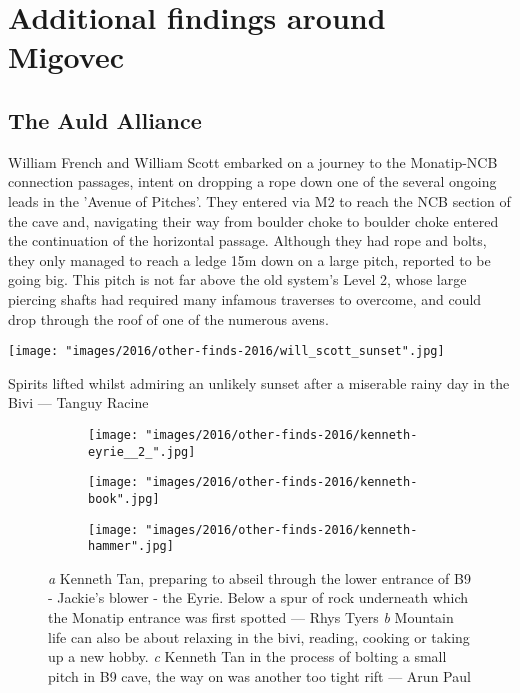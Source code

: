 \section{Additional findings around Migovec}

\subsection{The Auld Alliance}
William French and William Scott embarked on a journey to the Monatip-NCB connection passages, intent on dropping a rope down one of the several ongoing leads in the 'Avenue of Pitches'. They entered via M2 to reach the NCB section of the cave and, navigating their way from boulder choke to boulder choke entered the continuation of the horizontal passage. Although they had rope and bolts, they only managed to reach a ledge 15m down on a large pitch, reported to be going big. This pitch is not far above the old system's Level 2, whose large piercing shafts had required many infamous traverses to overcome, and could drop through the roof of one of the numerous avens.

\begin{marginfigure}
\checkoddpage \ifoddpage \forcerectofloat \else \forceversofloat \fi
\centering
 \texttt{[image: "images/2016/other-finds-2016/will\_scott\_sunset".jpg]} 
 \caption{Spirits lifted whilst admiring an unlikely sunset after a miserable rainy day in the Bivi --- Tanguy Racine}
 \label{Sunset}
\end{marginfigure}


\begin{figure*}[t!]
\checkoddpage \ifoddpage \forcerectofloat \else \forceversofloat \fi
\centering

    \begin{subfigure}[t]{0.5435\textwidth}
        \centering
        \texttt{[image: "images/2016/other-finds-2016/kenneth-eyrie\_\_2\_".jpg]} 
        \caption{} \label{moon door}
    \end{subfigure}
        \hfill
\begin{subfigure}[t]{0.4465\textwidth}
\centering
\texttt{[image: "images/2016/other-finds-2016/kenneth-book".jpg]}
 \caption{}\label{reading in the bivi}
\end{subfigure}
    \vspace{0cm}
    \begin{subfigure}[t]{\textwidth}
    \centering
        \texttt{[image: "images/2016/other-finds-2016/kenneth-hammer".jpg]} 
        \caption{} \label{hammer in B9}
    \end{subfigure}
    \caption{
    \emph{a}  Kenneth Tan, preparing to abseil through the lower entrance of B9 - Jackie's blower - the Eyrie. Below a spur of rock underneath which the Monatip entrance was first spotted --- Rhys Tyers
     \emph{b} Mountain life can also be about relaxing in the bivi, reading, cooking or taking up a new hobby.
     \emph{c}  Kenneth Tan in the process of bolting a small pitch in B9 cave, the way on was another too tight rift --- Arun Paul }
\end{figure*}

